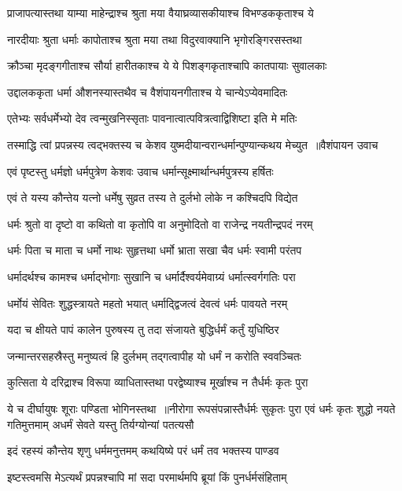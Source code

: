 \twolineshloka
{प्राजापत्यास्तथा याम्या माहेन्द्राश्च श्रुता मया}
{वैयाघ्रव्यासकीयाश्च विभण्डककृताश्च ये}


\twolineshloka
{नारदीयाः श्रुता धर्माः कापोताश्च श्रुता मया}
{तथा विदुरवाक्यानि भृगोरङ्गिरसस्तथा}


\twolineshloka
{क्रौञ्चा मृदङ्गगीताश्च सौर्या हारीतकाश्च ये}
{ये पिशङ्गकृताश्चापि कातपायाः सुवालकाः}


\twolineshloka
{उद्दालककृता धर्मा औशनस्यास्तथैव च}
{वैशंपायनगीताश्च ये चान्येऽप्येवमादितः}


\twolineshloka
{एतेभ्यः सर्वधर्मेभ्यो देव त्वन्मुखनिस्सृताः}
{पावनात्वात्पवित्रत्वाद्विशिष्टा इति मे मतिः}


\threelineshloka
{तस्माद्धि त्वां प्रपन्नस्य त्वद्भक्तस्य च केशव}
{युष्मदीयान्वरान्धर्मान्पुण्यान्कथय मेच्युत ॥वैशंपायन उवाच}
{}


\twolineshloka
{एवं पृष्टस्तु धर्मज्ञो धर्मपुत्रेण केशवः}
{उवाच धर्मान्सूक्ष्मार्थान्धर्मपुत्रस्य हर्षितः}


\twolineshloka
{एवं ते यस्य कौन्तेय यत्नो धर्मेषु सुव्रत}
{तस्य ते दुर्लभो लोके न कश्चिदपि विद्येत}


\twolineshloka
{धर्मः श्रुतो वा दृष्टो वा कथितो वा कृतोपि वा}
{अनुमोदितो वा राजेन्द्र नयतीन्द्रपदं नरम्}


\twolineshloka
{धर्मः पिता च माता च धर्मो नाथः सुहृत्तथा}
{धर्मो भ्राता सखा चैव धर्मः स्वामी परंतप}


\twolineshloka
{धर्मादर्थश्च कामश्च धर्माद्भोगाः सुखानि च}
{धर्मार्दैश्वर्यमेवाग्र्यं धर्मात्स्वर्गगतिः परा}


\twolineshloka
{धर्मोयं सेवितः शुद्धस्त्रायते महतो भयात्}
{धर्माद्द्विजत्वं देवत्वं धर्मः पावयते नरम्}


\twolineshloka
{यदा च क्षीयते पापं कालेन पुरुषस्य तु}
{तदा संजायते बुद्धिर्धर्मं कर्तुं युधिष्ठिर}


\twolineshloka
{जन्मान्तरसहस्रैस्तु मनुष्यत्वं हि दुर्लभम्}
{तद्गत्वापीह यो धर्मं न करोति स्ववञ्चितः}


\twolineshloka
{कुत्सिता ये दरिद्राश्च विरूपा व्याधितास्तथा}
{परद्वेष्याश्च मूर्खाश्च न तैर्धर्मः कृतः पुरा}


ये च दीर्घायुषः शूराः पण्डिता भोगिनस्तथा ॥नीरोगा रूपसंपन्नास्तैर्धर्मः सुकृतः पुरा
\twolineshloka
{एवं धर्मः कृतः शुद्धो नयते गतिमुत्तमाम्}
{अधर्मं सेवते यस्तु तिर्यग्योन्यां पतत्यसौ}


\twolineshloka
{इदं रहस्यं कौन्तेय शृणु धर्ममनुत्तमम्}
{कथयिष्ये परं धर्मं तव भक्तस्य पाण्डव}


\twolineshloka
{इष्टस्त्वमसि मेऽत्यर्थं प्रपन्नश्चापि मां सदा}
{परमार्थमपि ब्रूयां किं पुनर्धर्मसंहिताम्}


